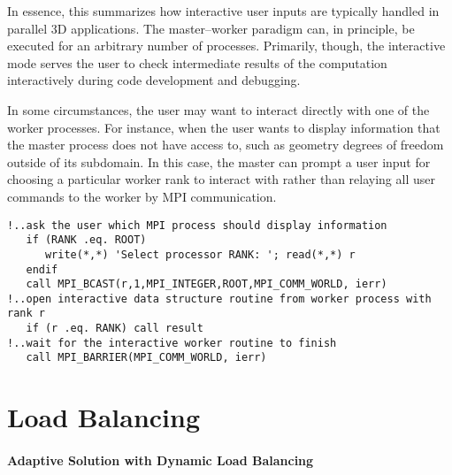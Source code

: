 In essence, this summarizes how interactive user inputs are typically handled in parallel \hp3D applications. The master--worker paradigm can, in principle, be executed for an arbitrary number of processes. Primarily, though, the interactive mode serves the user to check intermediate results of the computation interactively during code development and debugging.

\begin{remark}
In some circumstances, the user may want to interact directly with one of the worker processes. For instance, when the user wants to display information that the master process does not have access to, such as geometry degrees of freedom outside of its subdomain. In this case, the master can prompt a user input for choosing a particular worker rank to interact with rather than relaying all user commands to the worker by MPI communication.
\end{remark}

\begin{lstlisting}[caption=Initiating an interactive worker routine by a master broadcast., label={lst:interactive_mode_worker}]
!..ask the user which MPI process should display information
   if (RANK .eq. ROOT)
      write(*,*) 'Select processor RANK: '; read(*,*) r
   endif
   call MPI_BCAST(r,1,MPI_INTEGER,ROOT,MPI_COMM_WORLD, ierr)
!..open interactive data structure routine from worker process with rank r
   if (r .eq. RANK) call result
!..wait for the interactive worker routine to finish
   call MPI_BARRIER(MPI_COMM_WORLD, ierr)
\end{lstlisting}


\section{Load Balancing}
\label{sec:load-balancing}

\paragraph{Adaptive Solution with Dynamic Load Balancing}

